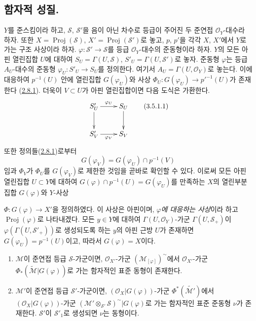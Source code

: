 \subsection{함자적 성질.}
\label{subsection:II.3.5-ko}

\begin{env}[3.5.1]
\label{II.3.5.1-ko}
$Y$를 준스킴이라 하고, $\mathcal{S}$, $\mathcal{S}'$을 음이 아닌 차수로
등급이 주어진 두 준연접 $\mathcal{O}_Y$-대수라 하자. 또한
$X=\operatorname{Proj}(\mathcal{S})$, $X'=\operatorname{Proj}(\mathcal{S}')$로
놓고, $p$, $p'$을 각각 $X$, $X'$에서 $Y$로 가는 구조 사상이라 하자.
$\varphi:\mathcal{S}'\to\mathcal{S}$를 등급 $\mathcal{O}_Y$-대수의
준동형이라 하자. $Y$의 모든 아핀 열린집합 $U$에 대하여
$S_U=\Gamma(U,\mathcal{S})$, $S'_U=\Gamma(U,\mathcal{S}')$로 놓자.
준동형 $\varphi$는 등급 $A_U$-대수의 준동형
$\varphi_U:S'_U\to S_U$를 정의한다. 여기서
$A_U=\Gamma(U,\mathcal{O}_Y)$로 놓는다. 이에 대응하여 $p^{-1}(U)$ 안에
열린집합 $G(\varphi_U)$와 사상
$\Phi_U:G(\varphi_U)\to p'^{-1}(U)$가 존재한다
(\hyperref[II.2.8.1-ko]{2.8.1}). 더욱이 $V\subset U$가 아핀
열린집합이면 다음 도식은 가환한다.
\[
\label{II.3.5.1.1-ko}
  \xymatrix{
    S'_U\ar[r]^{\varphi_U}\ar[d]
    & S_U\ar[d]\\
    S'_V\ar[r]_{\varphi_V}
    & S_V
  }
\tag{3.5.1.1}
\]
또한 정의들(\hyperref[II.2.8.1-ko]{2.8.1})로부터
\[
  G(\varphi_V)=G(\varphi_U)\cap p^{-1}(V)
\]
임과 $\Phi_V$가 $\Phi_U$를 $G(\varphi_V)$로 제한한 것임을 곧바로
확인할 수 있다. 이로써 모든 아핀 열린집합 $U\subset Y$에 대하여
$G(\varphi)\cap p^{-1}(U)=G(\varphi_U)$를 만족하는 $X$의 열린부분집합
$G(\varphi)$와 $Y$-사상


$\Phi:G(\varphi)\to X'$을 정의하였다. 이 사상은 아핀이며,
\emph{$\varphi$에 대응하는 사상}이라 하고
$\operatorname{Proj}(\varphi)$로 나타내겠다. 모든 $y\in Y$에 대하여
$\Gamma(U,\mathcal{O}_Y)$-가군 $\Gamma(U,\mathcal{S}_+)$이
$\varphi(\Gamma(U,\mathcal{S}'_+))$로 생성되도록 하는 $y$의 아핀 근방
$U$가 존재하면 $G(\varphi_U)=p^{-1}(U)$이고, 따라서
$G(\varphi)=X$이다.
\end{env}

\begin{proposition}[3.5.2]
\label{II.3.5.2-ko}
\begin{enumerate}
  \item[\rm(i)] $\mathcal{M}$이 준연접 등급 $\mathcal{S}$-가군이면,
    $\mathcal{O}_{X'}$-가군 $(\mathcal{M}_{[\varphi]})^{\sim}$에서
    $\mathcal{O}_{X'}$-가군
    $\Phi_*(\widetilde{\mathcal{M}}|G(\varphi))$로 가는 함자적인 표준
    동형이 존재한다.
  \item[\rm(ii)] $\mathcal{M}'$이 준연접 등급 $\mathcal{S}'$-가군이면,
    $(\mathcal{O}_X|G(\varphi))$-가군
    $\Phi^*(\widetilde{\mathcal{M}'})$에서
    $(\mathcal{O}_X|G(\varphi))$-가군
    $(\mathcal{M}'\otimes_{\mathcal{S}'}\mathcal{S})^{\sim}|G(\varphi)$로
    가는 함자적인 표준 준동형 $\nu$가 존재한다. $\mathcal{S}'$이
    $\mathcal{S}'_1$로 생성되면 $\nu$는 동형이다.
\end{enumerate}
\end{proposition}

